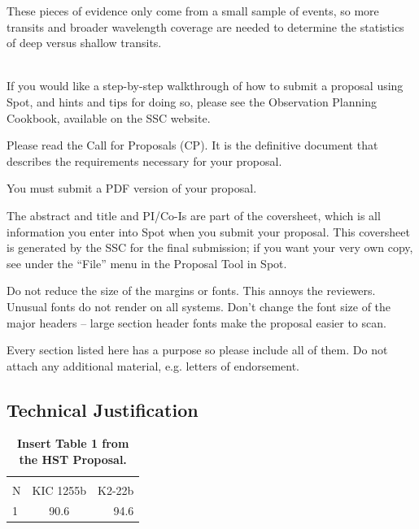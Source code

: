 \documentclass[letterpaper,12pt]{article}
\begin{document}
These pieces of evidence only come from a small sample of events, so more transits and broader wavelength coverage are needed to determine the statistics of deep versus shallow transits.




\\
If you would like a step-by-step walkthrough of how to submit a
proposal using Spot, and hints and tips for doing so, please see
the Observation Planning Cookbook, available on the SSC website.\newline

Please read the Call for Proposals (CP). It is
the definitive document that describes the requirements
necessary for your proposal. \newline 

You must submit a PDF version of your proposal. \newline

  The abstract and title and PI/Co-Is are part of
the coversheet, which is all information you enter into Spot
when you submit your proposal.  This coversheet is generated by
the SSC for the final submission; if you want your very own
copy, see under the ``File'' menu in the Proposal Tool in Spot.\newline

Do not reduce the size of the margins or fonts.  This annoys the reviewers.
Unusual fonts do not render on all systems.  Don't change the
font size of the major headers --  large section header
fonts make the proposal easier to scan. \newline

Every section listed here has a purpose so please include all of them.
Do not attach any additional material, e.g. letters of endorsement.



\subsection{Technical Justification}

\begin{table}[htbp]
   \centering
   \begin{tabular}{@{} lcr @{}} %
      \multicolumn{2}{c}{} \\
      N   & KIC 1255b & K2-22b \\
      \hline
      1      & 90.6 & 94.6 \\
   \end{tabular}
   \caption{\textbf{Insert Table 1 from the HST Proposal.}}
   \label{tab:probabilities}
\end{table}
\end{document}
